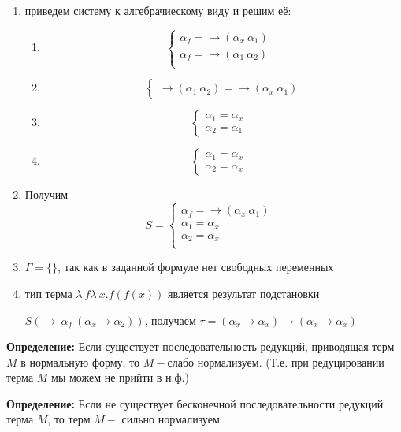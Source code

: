 \documentclass[12pt, a4paper]{article}
\begin{document}
	\begin{enumerate}
		\item приведем систему к алгебрачиескому виду и решим её:\par 
			\begin{enumerate}
			\item \[\begin{cases}
				\alpha_f=\rightarrow(\alpha_x\:\alpha_1)&\\
				\alpha_f=\rightarrow(\alpha_1\:\alpha_2)&\\
			\end{cases}\]
			\item \[
				\begin{cases}
				\rightarrow(\alpha_1\:\alpha_2)=\rightarrow(\alpha_x\:\alpha_1)
				\end{cases}\]
			\item \[
				\begin{cases}
				\alpha_1=\alpha_x&\\
				\alpha_2=\alpha_1
				\end{cases}\]
			\item \[
				\begin{cases}
				\alpha_1=\alpha_x&\\
				\alpha_2=\alpha_x
				\end{cases}\]
\end{enumerate}					
		\item  Получим \[S=\begin{cases}
						\alpha_f=\rightarrow(\alpha_x\:\alpha_1)&\\
						\alpha_1=\alpha_x&\\
						\alpha_2=\alpha_x&\\
				\end{cases}\]
		\item $\Gamma=\{\}$, так как в заданной формуле нет свободных переменных
		\item тип  терма $\lambda\:f\lambda\:x.f(f(x))$ является результат подстановки\par $S(\rightarrow\:\alpha_f\:(\alpha_x\rightarrow\alpha_2))$, получаем $\tau=(\alpha_x\rightarrow\alpha_x)\rightarrow(\alpha_x\rightarrow\alpha_x)$
	\end{enumerate}
	\textbf{Определение:} Если существует последовательность редукций, приводящая терм $M$ в нормальную форму, то $M-$слабо нормализуем. (Т.е. при редуцировании терма $M$ мы можем не прийти в н.ф.)\par 
	\textbf{Определение:} Если не существует бесконечной последовательности редукций терма $M$, то терм $M-$ сильно нормализуем.\par 
\end{document}
